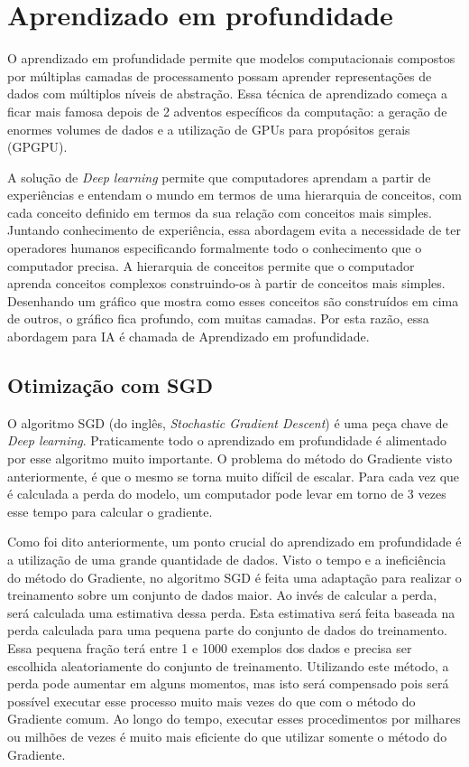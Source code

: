 \section{Aprendizado em profundidade}

O aprendizado em profundidade permite que modelos computacionais
compostos por múltiplas camadas de processamento possam aprender
representações de dados com múltiplos níveis de abstração\cite{LeCun}.
Essa técnica de aprendizado começa a ficar mais famosa depois de 2
adventos específicos da computação: a geração de enormes volumes de
dados e a utilização de GPUs para propósitos gerais (GPGPU).

A solução de \textit{Deep learning} permite que computadores aprendam
a partir de experiências e entendam o mundo em termos de uma
hierarquia de conceitos, com cada conceito definido em termos da sua
relação com conceitos mais simples. Juntando conhecimento de
experiência, essa abordagem evita a necessidade de ter operadores
humanos especificando formalmente todo o conhecimento que o computador
precisa. A hierarquia de conceitos permite que o computador aprenda
conceitos complexos construindo-os à partir de conceitos mais
simples. Desenhando um gráfico que mostra como esses conceitos são
construídos em cima de outros, o gráfico fica profundo, com muitas
camadas. Por esta razão, essa abordagem para IA é chamada de
Aprendizado em profundidade\cite{Goodfellow-et-al-2016-Book}.

\subsection{Otimização com SGD}

O algoritmo SGD (do inglês, \textit{Stochastic Gradient Descent}) é
uma peça chave de \textit{Deep learning}. Praticamente todo o
aprendizado em profundidade é alimentado por esse algoritmo muito
importante. O problema do método do Gradiente visto anteriormente, é
que o mesmo se torna muito difícil de escalar. Para cada vez que é
calculada a perda do modelo, um computador pode levar em torno de 3
vezes esse tempo para calcular o gradiente.

Como foi dito anteriormente, um ponto crucial do aprendizado em
profundidade é a utilização de uma grande quantidade de dados. Visto o
tempo e a ineficiência do método do Gradiente, no algoritmo SGD é
feita uma adaptação para realizar o treinamento sobre um conjunto de
dados maior. Ao invés de calcular a perda, será calculada uma
estimativa dessa perda. Esta estimativa será feita baseada na perda
calculada para uma pequena parte do conjunto de dados do
treinamento. Essa pequena fração terá entre 1 e 1000 exemplos dos
dados e precisa ser escolhida aleatoriamente do conjunto de
treinamento. Utilizando este método, a perda pode aumentar em alguns
momentos, mas isto será compensado pois será possível executar esse
processo muito mais vezes do que com o método do Gradiente
comum. Ao longo do tempo, executar esses procedimentos por milhares ou
milhões de vezes é muito mais eficiente do que utilizar somente o
método do Gradiente.


